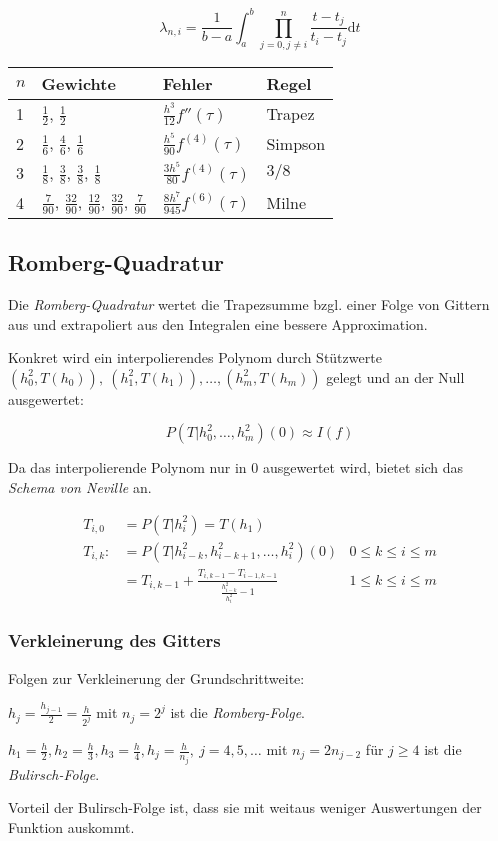 \vspace*{-2mm}
\[ \lambda_{n,i} = \frac{1}{b-a} \int_a^b \prod_{j=0,j\neq i}^n \frac{t-t_j}{t_i-t_j} \text{d}t \]

{
	\def\arraystretch{1.6}
	\begin{tabular}{ l | l | l | l }
	$n$ & Gewichte & Fehler & Regel \\
	\hline
	1 & $\frac{1}{2}$, $\frac{1}{2}$ & $\frac{h^3}{12}f''(\tau)$ & Trapez \\
	2 & $\frac{1}{6}$, $\frac{4}{6}$, $\frac{1}{6}$ & $\frac{h^5}{90}f^{(4)}(\tau)$ & Simpson \\
	3 & $\frac{1}{8}$, $\frac{3}{8}$, $\frac{3}{8}$, $\frac{1}{8}$ & $\frac{3h^5}{80}f^{(4)}(\tau)$ & $3/8$ \\
	4 & $\frac{7}{90}$, $\frac{32}{90}$, $\frac{12}{90}$, $\frac{32}{90}$, $\frac{7}{90}$ & $\frac{8h^7}{945}f^{(6)}(\tau)$ & Milne
	\end{tabular}
}

\subsection*{Romberg-Quadratur}

Die \emph{Romberg-Quadratur} wertet die Trapezsumme bzgl. einer Folge von Gittern aus und extrapoliert aus den Integralen eine bessere Approximation.

\spacing

Konkret wird ein interpolierendes Polynom durch Stützwerte $(h_0^2,T(h_0)),\ (h_1^2,T(h_1)),\dots,(h_m^2,T(h_m))$ gelegt und an der Null ausgewertet:

\vspace*{-2mm}
\[ P(T|h_0^2,\dots,h_m^2)(0) \approx I(f) \]

Da das interpolierende Polynom nur in $0$ ausgewertet wird, bietet sich das \emph{Schema von Neville} an.

\vspace*{-4mm}
\begin{align*}
T_{i,0} &= P(T|h_i^2) = T(h_1) \\
T_{i,k} :&= P(T|h_{i-k}^2,h_{i-k+1}^2,\dots,h_i^2)(0) &0 \leq k \leq i \leq m \\
&= T_{i,k-1} + \frac{T_{i,k-1}-T_{i-1,k-1}}{\frac{h_{i-k}^2}{h_i^2}-1} &1\leq k\leq i\leq m
\end{align*}

\subsubsection*{Verkleinerung des Gitters}

Folgen zur Verkleinerung der Grundschrittweite:

$h_j = \frac{h_{j-1}}{2} = \frac{h}{2^j}$ mit $n_j = 2^j$ ist die \emph{Romberg-Folge}.

\vspace*{1mm}

$h_1 = \frac{h}{2},h_2=\frac{h}{3},h_3=\frac{h}{4},h_j=\frac{h}{n_j},\ j=4,5,\dots$ mit $n_j = 2n_{j-2}$ für $j \geq 4$ ist die \emph{Bulirsch-Folge}.

\vspace*{1mm}

Vorteil der Bulirsch-Folge ist, dass sie mit weitaus weniger Auswertungen der Funktion auskommt.
